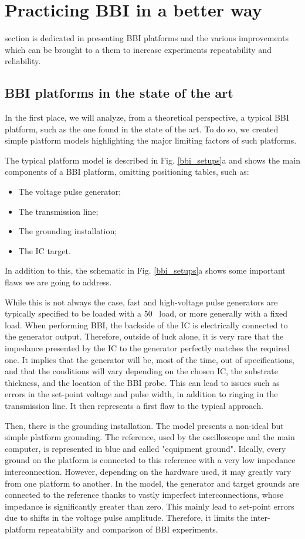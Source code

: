 
\section{Practicing BBI in a better way}
	 section is dedicated in presenting BBI platforms and the various improvements which can be brought to a them to increase experiments repeatability and reliability.
	\subsection{BBI platforms in the state of the art}
		In the first place, we will analyze, from a theoretical perspective, a typical BBI platform, such as the one found in the state of the art.
		To do so, we created simple platform models highlighting the major limiting factors of such platforms.
		
		The typical platform model is described in Fig. \ref{bbi_setups}a and shows the main components of a BBI platform, omitting positioning tables, such as:
		\begin{itemize}
			\item The voltage pulse generator;
			\item The transmission line;
			\item The grounding installation;
			\item The IC target.
		\end{itemize}
		In addition to this, the schematic in Fig. \ref{bbi_setups}a shows some important flaws we are going to address.

		While this is not always the case, fast and high-voltage pulse generators are typically specified to be loaded with a 50 \textOmega\ load, or more generally with a fixed load.
		When performing BBI, the backside of the IC is electrically connected to the generator output.
		Therefore, outside of luck alone, it is very rare that the impedance presented by the IC to the generator perfectly matches the required one.
		It implies that the generator will be, most of the time, out of specifications, and that the conditions will vary depending on the chosen IC, the substrate thickness, and the location of the BBI probe.
		This can lead to issues such as errors in the set-point voltage and pulse width, in addition to ringing in the transmission line.
		It then represents a first flaw to the typical approach.

		Then, there is the grounding installation.
		The model presents a non-ideal but simple platform grounding.
		The reference, used by the oscilloscope and the main computer, is represented in blue and called "equipment ground".
		Ideally, every ground on the platform is connected to this reference with a very low impedance interconnection.
		However, depending on the hardware used, it may greatly vary from one platform to another.
		In the model, the generator and target grounds are connected to the reference thanks to vastly imperfect interconnections, whose impedance is significantly greater than zero.
		This mainly lead to set-point errors due to shifts in the voltage pulse amplitude.
		Therefore, it limits the inter-platform repeatability and comparison of BBI experiments.

